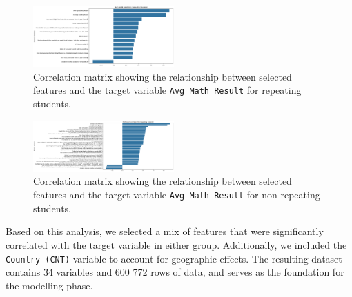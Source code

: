 \begin{figure}[H]
    \centering
    \includegraphics[width=0.48\textwidth]{figures/Q1_repratingcorrelations.png}
    \caption{Correlation matrix showing the relationship between selected features and the target variable \texttt{Avg Math Result} for repeating students.}
    \label{fig:correlation_chart_repeating}
\end{figure}


\begin{figure}[H]
    \centering
    \includegraphics[width=0.48\textwidth]{figures/Q1_nonrepeatingcorrelations.png}
    \caption{Correlation matrix showing the relationship between selected features and the target variable \texttt{Avg Math Result} for non repeating students.}
    \label{fig:correlation_chart_not_repeating}
\end{figure}


Based on this analysis, we selected a mix of features that were significantly correlated with the target variable in either group. Additionally, we included the \texttt{Country (CNT)} variable to account for geographic effects.
The resulting dataset contains 34 variables and 600 772 rows of data, and serves as the foundation for the modelling phase.